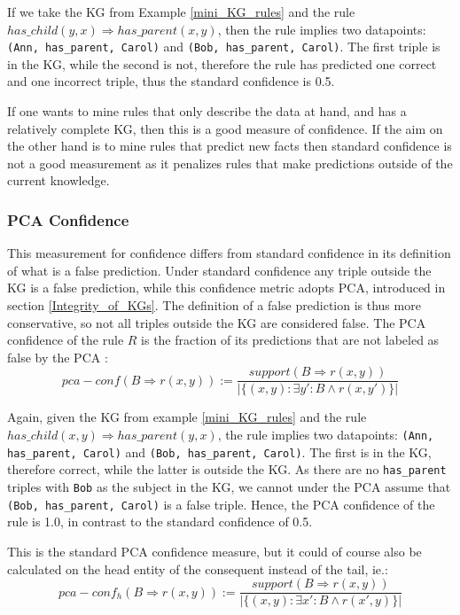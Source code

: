 If we take the KG from Example \ref{mini_KG_rules} and the rule $has\_child(y, x) \Rightarrow has\_parent(x, y)$, then the rule implies two datapoints: \texttt{(Ann, has\_parent, Carol)} and \texttt{(Bob, has\_parent, Carol)}. The first triple is in the KG, while the second is not, therefore the rule has predicted one correct and one incorrect triple, thus the standard confidence is 0.5.


If one wants to mine rules that only describe the data at hand, and has a relatively complete KG, then this is a good measure of confidence. If the aim on the other hand is to mine rules that predict new facts then standard confidence is not a good measurement as it penalizes rules that make predictions outside of the current knowledge.


\subsubsection{PCA Confidence}
This measurement for confidence differs from standard confidence in its definition of what is a false prediction. Under standard confidence any triple outside the KG is a false prediction, while this confidence metric adopts PCA, introduced in section \ref{Integrity_of_KGs}. The definition of a false prediction is thus more conservative, so not all triples outside the KG are considered false. The PCA confidence of the rule $R$ is the fraction of its predictions that are not labeled as false by the PCA \cite{amie}:
\[pca-conf(B\Rightarrow r(x, y)) := \frac{support(B\Rightarrow r(x, y))}{|\{(x, y):\exists y' : B \wedge r(x, y')\}|}\]

Again, given the KG from example \ref{mini_KG_rules} and the rule $has\_child(x, y) \Rightarrow has\_parent(y, x)$, the rule implies two datapoints: \texttt{(Ann, has\_parent, Carol)} and \texttt{(Bob, has\_parent, Carol)}. The first is in the KG, therefore correct, while the latter is outside the KG. As there are no \texttt{has\_parent} triples with \texttt{Bob} as the subject in the KG, we cannot under the PCA assume that \texttt{(Bob, has\_parent, Carol)} is a false triple. Hence, the PCA confidence of the rule is 1.0, in contrast to the standard confidence of 0.5.

This is the standard PCA confidence measure, but it could of course also be calculated on the head entity of the consequent instead of the tail, ie.: 
\[pca-conf_h(B\Rightarrow r(x, y)) := \frac{support(B\Rightarrow r(x, y))}{|\{(x, y):\exists x' : B \wedge r(x', y)\}|}\]

